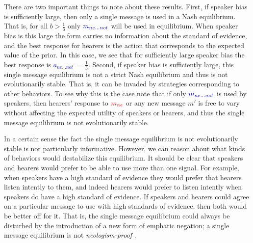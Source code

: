 \documentclass[linguex]{sp}
\theoremstyle{definition} \newtheorem{definition}{Definition}
\begin{document}
There are two important things to note about these results. First, if speaker bias is sufficiently large, then only a single message is used in a Nash equilibrium. That is, for all $b > \frac{1}{6}$ only $\textcolor{blue}{m_{ne...not}}$ will be used in equilibrium.  When speaker bias is this large the form carries no information about the standard of evidence, and the best response for hearers is the action that corresponds to the expected value of the prior. In this case, we see that for sufficiently large speaker bias the best response is \emph{\textcolor{blue}{$a_{ne...not}$}} $ = \frac{1}{3}$. Second, if speaker bias is sufficiently large, this single message equilibrium is not a strict Nash equilibrium and thus is not evolutionarily stable. That is, it can be invaded by strategies corresponding to other behaviors. To see why this is the case note that if only $\textcolor{blue}{m_{ne...not}}$ is used by speakers, then hearers' response to $\textcolor{red}{m_{ne}}$ or any new message $m'$ is free to vary without affecting the expected utility of speakers or hearers, and thus the single message equilibrium is not evolutionarily stable.  

In a certain sense the fact the single message equilibrium is not evolutionarily stable is not particularly informative. However, we can reason about what kinds of behaviors would destabilize this equilibrium. It should be clear that speakers and hearers would prefer to be able to use more than one signal. For example, when speakers have a high standard of evidence they would prefer that hearers listen intently to them, and indeed hearers would prefer to listen intently when speakers do have a high standard of evidence. If speakers and hearers could agree on a particular message to use with high standards of evidence, then both would be better off for it. That is, the single message equilibrium could always be disturbed by the introduction of a new form of emphatic negation; a single message equilibrium is not \emph{neologism-proof} \citep{farrell:1993}.
\end{document}

